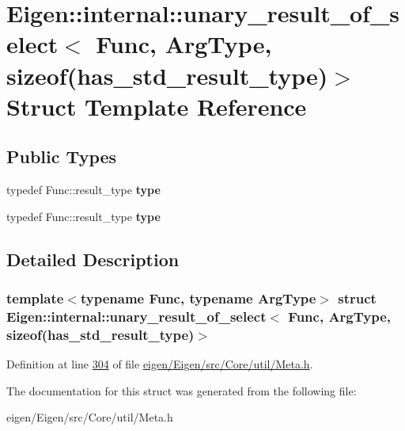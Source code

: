 \hypertarget{struct_eigen_1_1internal_1_1unary__result__of__select_3_01_func_00_01_arg_type_00_01sizeof_07has__std__result__type_08_4}{}\section{Eigen\+:\+:internal\+:\+:unary\+\_\+result\+\_\+of\+\_\+select$<$ Func, Arg\+Type, sizeof(has\+\_\+std\+\_\+result\+\_\+type)$>$ Struct Template Reference}
\label{struct_eigen_1_1internal_1_1unary__result__of__select_3_01_func_00_01_arg_type_00_01sizeof_07has__std__result__type_08_4}
\subsection*{Public Types}
\begin{DoxyCompactItemize}
\item 
\mbox{\label{struct_eigen_1_1internal_1_1unary__result__of__select_3_01_func_00_01_arg_type_00_01sizeof_07has__std__result__type_08_4_a1619b45bef06c164e0863c5f6b018c4b}} 
typedef Func\+::result\+\_\+type {\bfseries type}
\item 
\mbox{\label{struct_eigen_1_1internal_1_1unary__result__of__select_3_01_func_00_01_arg_type_00_01sizeof_07has__std__result__type_08_4_a1619b45bef06c164e0863c5f6b018c4b}} 
typedef Func\+::result\+\_\+type {\bfseries type}
\end{DoxyCompactItemize}


\subsection{Detailed Description}
\subsubsection*{template$<$typename Func, typename Arg\+Type$>$\newline
struct Eigen\+::internal\+::unary\+\_\+result\+\_\+of\+\_\+select$<$ Func, Arg\+Type, sizeof(has\+\_\+std\+\_\+result\+\_\+type)$>$}



Definition at line \hyperlink{eigen_2_eigen_2src_2_core_2util_2_meta_8h_source_l00304}{304} of file \hyperlink{eigen_2_eigen_2src_2_core_2util_2_meta_8h_source}{eigen/\+Eigen/src/\+Core/util/\+Meta.\+h}.



The documentation for this struct was generated from the following file\+:\begin{DoxyCompactItemize}
\item 
eigen/\+Eigen/src/\+Core/util/\+Meta.\+h\end{DoxyCompactItemize}
